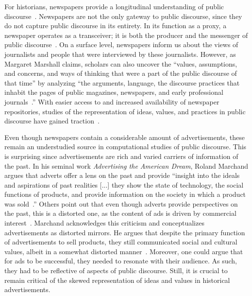 \documentclass[USenglish]{article}
\begin{document}
For historians, newspapers provide a longitudinal understanding of public discourse~\cite{postman_amusing_2005,vree_nederlandse_1989}. Newspapers are not the only gateway to public discourse, since they do not capture public discourse in its entirety. In its function as a proxy, a newspaper operates as a transceiver; it is both the producer and the messenger of public discourse~\cite[17-18]{schudson_power_1982}. On a surface level, newspapers inform us about the views of journalists and people that were interviewed by these journalists. However, as Margaret Marshall claims, scholars can also uncover the ``values, assumptions, and concerns, and ways of thinking that were a part of the public discourse of that time'' by analyzing ``the arguments, language, the discourse practices that inhabit the pages of public magazines, newspapers, and early professional journals~\cite[8]{marshall_contesting_1995}.'' With easier access to and increased availability of newspaper repositories, studies of the representation of ideas, values, and practices in public discourse have gained traction~\cite{van_eijnatten_eurocentric_2019,daems_workers_2019}. 

Even though newspapers contain a considerable amount of advertisements, these remain an understudied source in computational studies of public discourse. This is surprising since advertisements are rich and varied carriers of information of the past. In his seminal work \textit{Advertising the American Dream}, Roland Marchand argues that adverts offer a lens on the past and provide ``insight into the ideals and aspirations of past realities [...] they show the state of technology, the social functions of products, and provide information on the society in which a product was sold~\cite{marchand_advertising_1985}.'' Others point out that even though adverts provide perspectives on the past, this is a distorted one, as the content of ads is driven by commercial interest~\cite{fox_mirror_1997}. 
%
Marchand acknowledges this criticism and conceptualizes advertisements as distorted mirrors. He argues that despite the primary function of advertisements to sell products, they still communicated social and cultural values, albeit in a somewhat distorted manner~\cite{marchand_advertising_1985,lears_fables_1994}. Moreover, one could argue that for ads to be successful, they needed to resonate with their audience. As such, they had to be reflective of aspects of public discourse. Still, it is crucial to remain critical of the skewed representation of ideas and values in historical advertisements. 
\end{document}
